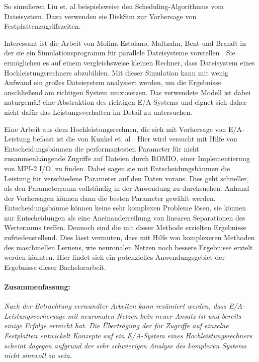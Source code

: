 \documentclass[
	12pt,
	a4paper,
	BCOR10mm,
	DIV14,
	listof=totoc,
	bibliography=totoc,
	headsepline
]{scrreprt}
\begin{document}
So simulieren Liu et. al \cite{liu2011towards} beispielsweise den Scheduling-Algorithmus vom Dateisystem. Dazu verwenden sie DiskSim \cite{Bucy08thedisksim} zur Vorhersage von Festplattenzugriffszeiten.

Interessant ist die Arbeit von Molina-Estolano, Maltzahn, Bent und Brandt in der sie ein Simulationsprogramm für parallele Dateisysteme vorstellen \cite{molina2009building}. Sie ermöglichen es auf einem vergleichsweise kleinen Rechner, dass Dateisystem eines Hochleistungsrechners abzubilden. Mit dieser Simulation kann mit wenig Aufwand ein großes Dateisystem analysiert werden, um die Ergebnisse anschließend am richtigen System umzusetzen. Das verwendete Modell ist dabei naturgemäß eine Abstraktion des richtigen E/A-Systems und eignet sich daher nicht dafür das Leistungsverhalten im Detail zu untersuchen.

Eine Arbeit aus dem Hochleistungsrechnen, die sich mit Vorhersage von E/A-Leistung befasst ist die von Kunkel et. al \cite{UMLTPTPONI15}. Hier wird versucht mit Hilfe von Entscheidungsbäumen die performantesten Parameter für nicht zusammenhängende Zugriffe auf Dateien durch ROMIO, einer Implementierung von MPI-2 I/O, zu finden.
Dabei sagen sie mit Entscheidungsbäumen die Leistung für verschiedene Parameter auf den Daten voraus. Dies geht schneller, als den Parameterraum vollständig in der Anwendung zu durchsuchen. Anhand der Vorhersagen können dann die besten Parameter gewählt werden.
Entscheidungsbäume können keine sehr komplexen Probleme lösen, sie können nur Entscheidungen als eine Aneinanderreihung von linearen Separationen des Werteraums treffen. Dennoch sind die mit dieser Methode erzielten Ergebnisse zufriedenstellend. Dies lässt vermuten, dass mit Hilfe von komplexeren Methoden des maschinellen Lernens, wie neuronalen Netzen noch bessere Ergebnisse erzielt werden könnten.
Hier findet sich ein potenzielles Anwendungsgebiet der Ergebnisse dieser Bachelorarbeit.

\paragraph{Zusammenfassung:}
\textit{
	Nach der Betrachtung verwandter Arbeiten kann resümiert werden, dass E/A-Leistungsvorhersage mit neuronalen Netzen kein neuer Ansatz ist und bereits einige Erfolge erreicht hat. Die Übertragung der für Zugriffe auf einzelne Festplatten entwickelt Konzepte auf ein E/A-System eines Hochleistungsrechners scheint dagegen aufgrund der sehr schwierigen Analyse des komplexen Systems nicht sinnvoll zu sein.
}
\end{document}
